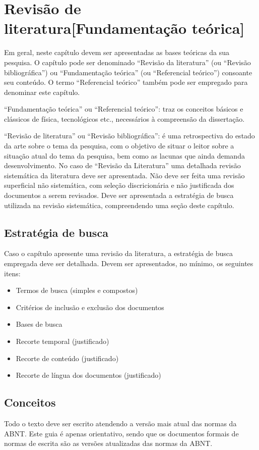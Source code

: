 \chapter{Revisão de literatura[Fundamentação teórica]}
\thispagestyle{empty}
Em geral, neste capítulo devem ser apresentadas as bases teóricas da sua pesquisa. O capítulo pode ser denominado “Revisão da literatura” (ou “Revisão bibliográfica”) ou “Fundamentação teórica” (ou “Referencial teórico”) consoante seu conteúdo. O termo “Referencial teórico” também pode ser empregado para denominar este capítulo.

“Fundamentação teórica” ou “Referencial teórico”: traz os conceitos básicos e clássicos de física, tecnológicos etc., necessários à compreensão da dissertação.

“Revisão de literatura” ou “Revisão bibliográfica”: é uma retrospectiva do estado da arte sobre o tema da pesquisa, com o objetivo de situar o leitor sobre a situação atual do tema da pesquisa, bem como as lacunas que ainda demanda desenvolvimento. No caso de “Revisão da Literatura” uma detalhada revisão sistemática da literatura deve ser apresentada. Não deve ser feita uma revisão superficial não sistemática, com seleção discricionária e não justificada dos documentos a serem revisados. Deve ser apresentada a estratégia de busca utilizada na revisão sistemática, compreendendo uma seção deste capítulo.

\section{Estratégia de busca}
Caso o capítulo apresente uma revisão da literatura, a estratégia de busca empregada deve ser detalhada. Devem ser apresentados, no mínimo, os seguintes itens:
\begin{itemize}
    \item Termos de busca (simples e compostos)
    \item Critérios de inclusão e exclusão dos documentos
    \item Bases de busca
    \item Recorte temporal (justificado)
    \item Recorte de conteúdo (justificado)
    \item Recorte de língua dos documentos (justificado)
\end{itemize}

\section{Conceitos}
Todo o texto deve ser escrito atendendo a versão mais atual das normas da ABNT. Este guia é apenas orientativo, sendo que os documentos formais de normas de escrita são as versões atualizadas das normas da ABNT.

